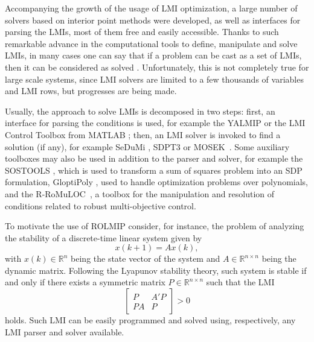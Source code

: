 \documentclass[english,11pt]{article}
\theoremstyle{break} \theorembodyfont{\small\rm}
\begin{document}
Accompanying the growth of the usage of LMI optimization, a large number of solvers based on interior point methods
were developed, as well as interfaces for parsing the LMIs, most of them free and easily accessible.
Thanks to such remarkable advance in the computational tools
to define, manipulate and solve LMIs, in many cases one can say that if a problem
can be cast as a set of LMIs, then it can be considered as solved \cite{BEFB:94}. 
Unfortunately, this is not completely true for large scale systems, since LMI
solvers are limited to a few thousands of variables and LMI rows, but progresses
are being made.

Usually, the approach to solve LMIs is decomposed in two steps: first, an interface for parsing the conditions is
used, for example the YALMIP \cite{Lof:04} or the LMI Control Toolbox from
MATLAB \cite{GNLC:95}; then, an LMI solver is invoked to find a solution (if any),
for example SeDuMi \cite{Stu:99}, SDPT3 \cite{TTT:99} or MOSEK~\cite{AA:00}. Some auxiliary toolboxes
may also be used in addition to the parser and solver, for example the SOSTOOLS
\cite{PPSP:04}, which is used to transform a sum of squares problem into an SDP
formulation, GloptiPoly \cite{HL:03c}, used to handle optimization problems
over polynomials, and the R-RoMuLOC~\cite{rromuloc,rromulocconf,romulocconf,ractconf}, a toolbox for the manipulation and
resolution of conditions related to robust multi-objective control.

To motivate the use of ROLMIP consider, for instance, the problem of analyzing the
stability of a discrete-time linear system given by
\begin{equation}\label{eq_discr_system}
 x(k+1) = Ax(k),
\end{equation}
with $x(k) \in \mathbb{R}^n$ being the state vector of the system and $A \in \mathbb{R}^{n \times n}$
being the dynamic matrix. Following the Lyapunov stability theory, such system is stable if and only if
there exists a symmetric matrix $P \in \mathbb{R}^{n \times n}$
such that the LMI
\begin{equation}\label{eq_estab_discr}
 \begin{bmatrix} P & A'P \\ PA & P \end{bmatrix} > 0
\end{equation}
holds. Such LMI can be easily programmed and solved using, respectively, 
any LMI parser and solver available.
\end{document}
